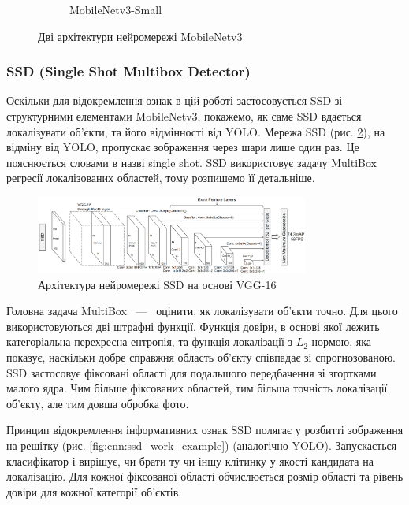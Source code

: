 \begin{figure}[H]
\begin{subfigure}[c]{0.4\textwidth}
        \caption{MobileNetv3-Small
        }
    \end{subfigure}
    \caption{Дві архітектури нейромережі MobileNetv3 \cite{mobilenetv3}
        \label{fig:cnn:mobilenetv3_architecture}
    }
\end{figure}

\subsubsection{SSD (Single Shot Multibox Detector)}

Оскільки для відокремлення ознак в цій роботі застосовується SSD зі
структурними елементами MobileNetv3, покажемо, як саме SSD вдається
локалізувати об'єкти, та його відмінності від YOLO.
Мережа SSD (рис. \ref{fig:cnn:ssd_architecture}), на відміну від YOLO, пропускає зображення
через шари лише один раз. Це пояснюється словами в назві single shot.
SSD використовує задачу MultiBox регресії локалізованих областей, тому розпишемо її детальніше.
\begin{figure}[H]
    \centering
    \includegraphics[width=0.8\textwidth]{images/cnn_ssd_architecture}
    \caption{Архітектура нейромережі SSD на основі VGG-16    \cite{ssd}
        \label{fig:cnn:ssd_architecture}
    }
\end{figure}
Головна задача MultiBox ~---~ оцінити, як локалізувати об'єкти точно. Для цього використовуються
дві штрафні функції. Функція довіри, в основі якої лежить категоріальна перехресна ентропія, та
функція локалізації з $L_2$ нормою, яка показує, наскільки добре справжня область об'єкту співпадає
зі спрогнозованою.
SSD застосовує фіксовані області для подальшого передбачення
зі згортками малого ядра.
Чим більше фіксованих областей, тим більша точність локалізації об'єкту,
але тим довша обробка фото.

Принцип відокремлення інформативних ознак SSD полягає у розбитті зображення на решітку
(рис. \ref{fig:cnn:ssd_work_example}) (аналогічно YOLO). Запускається класифікатор
і вирішує, чи брати ту чи іншу клітинку у якості кандидата на локалізацію.
Для кожної фіксованої області обчислюється розмір
області та рівень довіри для кожної категорії об'єктів.

